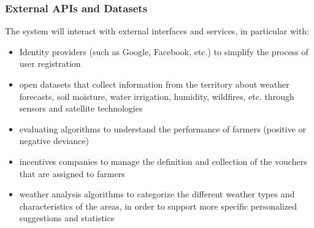 \subsubsection{External APIs and Datasets}
The system will interact with external interfaces and services, in particular with:
\begin{itemize}
    \item Identity providers (such as Google, Facebook, etc.) to simplify the process of user registration
    \item open datasets that collect information from the territory about weather forecasts, soil moisture, water irrigation, humidity, wildfires, etc. through sensors and satellite technologies
    \item evaluating algorithms to understand the performance of farmers (positive or negative deviance)
    \item incentives companies to manage the definition and collection of the vouchers that are assigned to farmers
    \item weather analysis algorithms to categorize the different weather types and characteristics of the areas, in order to support more specific personalized suggestions and statistics
\end{itemize}